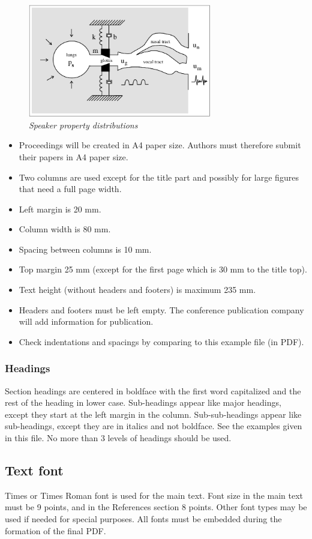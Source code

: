 \documentclass[a4paper]{article}
\begin{document}
\begin{figure}[t]
\centerline{\includegraphics[width=80mm]{figure}}
\caption{{\it Speaker property distributions}}  
\label{dists}
\end{figure}

\begin{itemize}
\item Proceedings will be created in A4 paper size.
Authors must therefore submit their papers in A4 paper size.
\item Two columns are used except for the title part and possibly for large 
figures that need a full page width.
\item Left margin is 20 mm.
\item Column width is 80 mm.
\item Spacing between columns is 10 mm.
\item Top margin 25 mm (except for the first page which is 30 mm to the title top).
\item Text height (without headers and footers) is maximum 235 mm.
\item Headers and footers must be left empty.
The conference publication company will add information for publication.
\item Check indentations and spacings by comparing to this 
example file (in PDF).
\end{itemize}


\subsubsection{Headings}
Section headings are centered in boldface with the first word capitalized and the rest of the heading in lower case.
Sub-headings appear like major headings, except they start at the left margin in the column.
Sub-sub-headings appear like sub-headings, except they are in italics and not boldface.
See the examples given in this file.
No more than 3 levels of headings should be used.


\subsection{Text font}
Times or Times Roman font is used for the main text. 
Font size in the main text must be 9 points, and in the References section 8 points.
Other font types may be used if needed for special purposes.
All fonts must be embedded during the formation of the final PDF.
\end{document}
